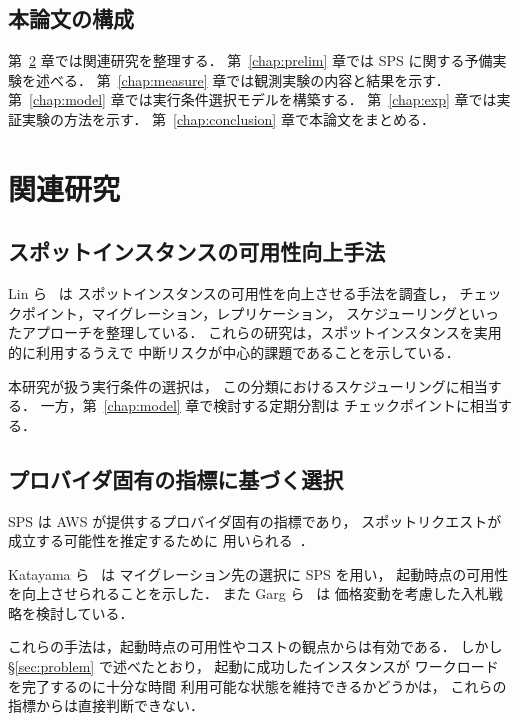 \documentclass[11pt,a4paper]{ltjsreport}
\begin{document}
\section{本論文の構成}

第~\ref{chap:related} 章では関連研究を整理する．
第~\ref{chap:prelim} 章では SPS に関する予備実験を述べる．
第~\ref{chap:measure} 章では観測実験の内容と結果を示す．
第~\ref{chap:model} 章では実行条件選択モデルを構築する．
第~\ref{chap:exp} 章では実証実験の方法を示す．
第~\ref{chap:conclusion} 章で本論文をまとめる．

\chapter{関連研究}
\label{chap:related}

\section{スポットインスタンスの可用性向上手法}

Lin ら~\cite{Lin2022Survey} は
スポットインスタンスの可用性を向上させる手法を調査し，
チェックポイント，マイグレーション，レプリケーション，
スケジューリングといったアプローチを整理している．
これらの研究は，スポットインスタンスを実用的に利用するうえで
中断リスクが中心的課題であることを示している．

本研究が扱う実行条件の選択は，
この分類におけるスケジューリングに相当する．
一方，第~\ref{chap:model} 章で検討する定期分割は
チェックポイントに相当する．

\section{プロバイダ固有の指標に基づく選択}

SPS は AWS が提供するプロバイダ固有の指標であり，
スポットリクエストが成立する可能性を推定するために
用いられる~\cite{AWSSPS}．

Katayama ら~\cite{Katayama2022} は
マイグレーション先の選択に SPS を用い，
起動時点の可用性を向上させられることを示した．
また Garg ら~\cite{Garg2025} は
価格変動を考慮した入札戦略を検討している．

これらの手法は，起動時点の可用性やコストの観点からは有効である．
しかし\S\ref{sec:problem} で述べたとおり，
起動に成功したインスタンスが
ワークロードを完了するのに十分な時間
利用可能な状態を維持できるかどうかは，
これらの指標からは直接判断できない．
\end{document}
